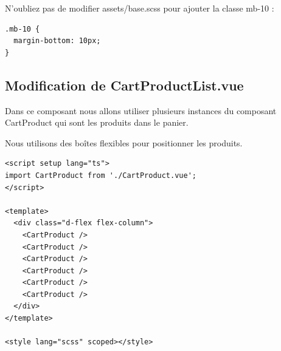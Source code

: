 N'oubliez pas de modifier assets/base.scss pour ajouter la classe mb-10 :
\begin{verbatim}
.mb-10 {
  margin-bottom: 10px;
}
\end{verbatim}

\subsection{Modification de CartProductList.vue}
Dans ce composant nous allons utiliser plusieurs instances du composant CartProduct qui sont les produits dans le panier.

Nous utilisons des boîtes flexibles pour positionner les produits.
\begin{verbatim}
<script setup lang="ts">
import CartProduct from './CartProduct.vue';
</script>

<template>
  <div class="d-flex flex-column">
    <CartProduct />
    <CartProduct />
    <CartProduct />
    <CartProduct />
    <CartProduct />
    <CartProduct />
  </div>
</template>

<style lang="scss" scoped></style>
\end{verbatim}

